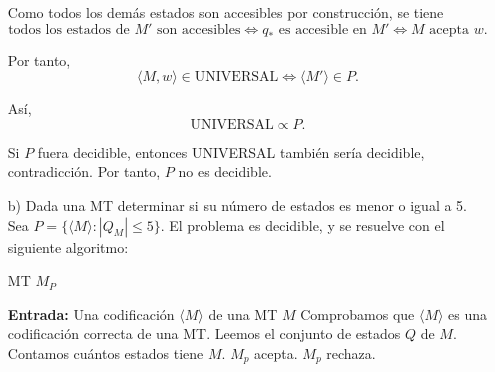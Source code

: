 \begin{ejercicio}
\begin{itemize}
        Como todos los demás estados son accesibles por construcción, se tiene
        $$\text{todos los estados de }M'\text{ son accesibles} \iff q_* \text{ es accesible en } M' \iff
        M \text{ acepta } w.$$

        Por tanto, $$\langle M,w\rangle\in \text{UNIVERSAL} \iff \langle M'\rangle\in P. $$

        Así, $$\text{UNIVERSAL} \propto P.$$

        Si $P$ fuera decidible, entonces UNIVERSAL también sería decidible, contradicción.
        Por tanto, $P$ no es decidible.

        

        \item[b)] Dada una MT determinar si su número de estados es menor o igual a 5. \\
        
        Sea $P  = \{\langle M \rangle : |Q_M| \leq 5\}$. El problema es decidible, y se resuelve con el siguiente algoritmo:

        \begin{algorithm}
            \caption{MT $M_P$}
            \begin{algorithmic}
                \State \textbf{Entrada:} Una codificación $\langle M\rangle$ de una MT $M$
                \State Comprobamos que $\langle M\rangle$ es una codificación correcta de una MT.
                \State Leemos el conjunto de estados $Q$ de $M$.
                \State Contamos cuántos estados tiene $M$.
                    \State $M_p$ acepta.
                \Else
                    \State $M_p$ rechaza.
                \EndIf
            \end{algorithmic}
        \end{algorithm}

    \end{itemize}
\end{ejercicio}





